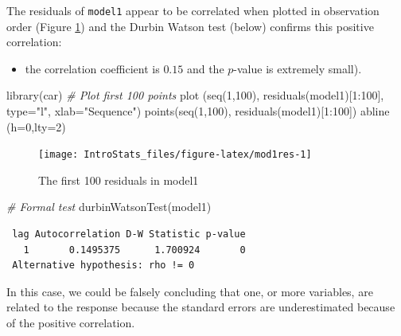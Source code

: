 \documentclass[
  oneside]{krantz}
\newenvironment{Shaded}{\begin{snugshade}}{\end{snugshade}}
\newcommand{\AttributeTok}[1]{\textcolor[rgb]{0.77,0.63,0.00}{#1}}
\newcommand{\CommentTok}[1]{\textcolor[rgb]{0.56,0.35,0.01}{\textit{#1}}}
\newcommand{\DecValTok}[1]{\textcolor[rgb]{0.00,0.00,0.81}{#1}}
\newcommand{\FunctionTok}[1]{\textcolor[rgb]{0.00,0.00,0.00}{#1}}
\newcommand{\NormalTok}[1]{#1}
\newcommand{\SpecialCharTok}[1]{\textcolor[rgb]{0.00,0.00,0.00}{#1}}
\newcommand{\StringTok}[1]{\textcolor[rgb]{0.31,0.60,0.02}{#1}}
\providecommand{\tightlist}{%
  \setlength{\itemsep}{0pt}\setlength{\parskip}{0pt}}
\begin{document}
The residuals of \texttt{model1} appear to be correlated when plotted in observation order (Figure \ref{fig:mod1res}) and the Durbin Watson test (below) confirms this positive correlation:

\begin{itemize}
\tightlist
\item
  the correlation coefficient is \(0.15\) and the \(p\)-value is extremely small).
\end{itemize}

\begin{Shaded}
\begin{Highlighting}[]
\FunctionTok{library}\NormalTok{(car)}
\CommentTok{\# Plot first 100 points }
\FunctionTok{plot}\NormalTok{ (}\FunctionTok{seq}\NormalTok{(}\DecValTok{1}\NormalTok{,}\DecValTok{100}\NormalTok{), }\FunctionTok{residuals}\NormalTok{(model1)[}\DecValTok{1}\SpecialCharTok{:}\DecValTok{100}\NormalTok{], }\AttributeTok{type=}\StringTok{"l"}\NormalTok{, }\AttributeTok{xlab=}\StringTok{"Sequence"}\NormalTok{)}
\FunctionTok{points}\NormalTok{(}\FunctionTok{seq}\NormalTok{(}\DecValTok{1}\NormalTok{,}\DecValTok{100}\NormalTok{), }\FunctionTok{residuals}\NormalTok{(model1)[}\DecValTok{1}\SpecialCharTok{:}\DecValTok{100}\NormalTok{])}
\FunctionTok{abline}\NormalTok{ (}\AttributeTok{h=}\DecValTok{0}\NormalTok{,}\AttributeTok{lty=}\DecValTok{2}\NormalTok{)}
\end{Highlighting}
\end{Shaded}

\begin{figure}

{\centering \texttt{[image: IntroStats\_files/figure-latex/mod1res-1]} 

}

\caption{The first 100 residuals in model1}\label{fig:mod1res}
\end{figure}

\begin{Shaded}
\begin{Highlighting}[]
\CommentTok{\# Formal test}
\FunctionTok{durbinWatsonTest}\NormalTok{(model1)}
\end{Highlighting}
\end{Shaded}

\begin{verbatim}
 lag Autocorrelation D-W Statistic p-value
   1       0.1495375      1.700924       0
 Alternative hypothesis: rho != 0
\end{verbatim}

In this case, we could be falsely concluding that one, or more variables, are related to the response because the standard errors are underestimated because of the positive correlation.
\end{document}
